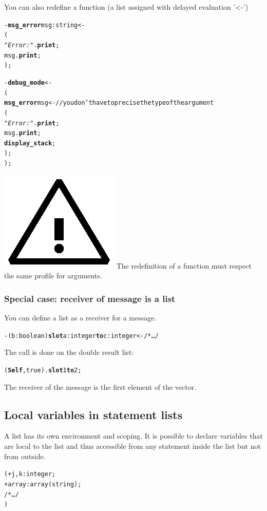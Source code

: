 \documentclass[11pt]{mybook}
\newcommand{\warning}{\includegraphics[scale=0.3]{figures/warning}}
\begin{document}
You can also redefine a function (a list assigned with delayed evaluation '<-')

\begin{alltt}
  - {\bf{}msg\_error} msg:{\sc{}string} <-
    (
      {\it{}"Error : "}.{\bf{}print};
      msg.{\bf{}print};
    );

  - {\bf{}debug\_mode} <-
    (
      {\bf{}msg\_error} msg <-    // you don't have to precise the type of the argument
       ( 
        {\it{}"Error : "}.{\bf{}print};
        msg.{\bf{}print};
        {\bf{}display\_stack};
       ); 
    );
\end{alltt}
\warning{} The redefinition of a function must respect the same profile for arguments.

\subsubsection{Special case: receiver of message is a list}
\label{language_reference:lists:use:special_case}
You can define a list as a receiver for a message.
\begin{alltt}
  - (b:{\sc{}boolean}) {\bf{}slot} a:{\sc{}integer} {\bf{}to} c:{\sc{}integer} <- /* \ldots */
\end{alltt}
The call is done on the double result list:
\begin{alltt}
  ({\bf{}Self},{\sc{}true}).{\bf{}slot} 1 {\bf{}to} 2;
\end{alltt}
The receiver of the message is the first element of the vector.

\subsection{Local variables in statement lists}
\label{language_reference:lists:locals}
A list has its own environment and scoping.
It is possible to declare variables that are local to the list and
thus accessible from any statement inside the list but not from
outside.

\begin{alltt}
  ( + j,k:{\sc{}integer}; 
    + array:{\sc{}array}({\sc{}string});
    /* \ldots */
  )
\end{alltt}
\end{document}
